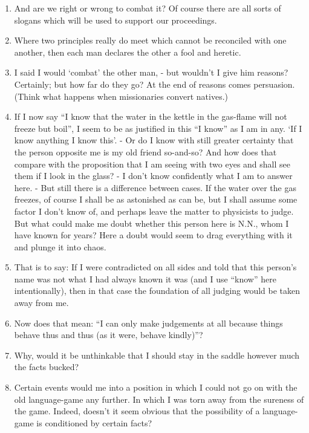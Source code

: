 \documentclass{book}
\begin{document}
\begin{enumerate}
\item
And are we right or wrong to combat it? Of course there are all sorts of
slogans which will be used to support our proceedings.

\item
Where two principles really do meet which cannot be reconciled with one
another, then each man declares the other a fool and heretic.

\item
I said I would `combat' the other man, - but wouldn't I give him reasons?
Certainly; but how far do they go? At the end of reasons comes persuasion.
(Think what happens when missionaries convert natives.)

\item
If I now say ``I know that the water in the kettle in the gas-flame will not
freeze but boil'', I seem to be as justified in this ``I know'' as I am in any.
`If I know anything I know this'. - Or do I know with still greater certainty
that the person opposite me is my old friend so-and-so? And how does that
compare with the proposition that I am seeing with two eyes and shall see them
if I look in the glass? - I don't know confidently what I am to answer here. -
But still there is a difference between cases. If the water over the gas
freezes, of course I shall be as astonished as can be, but I shall assume some
factor I don't know of, and perhaps leave the matter to physicists to judge.
But what could make me doubt whether this person here is N.N., whom I have
known for years? Here a doubt would seem to drag everything with it and plunge
it into chaos.

\item
That is to say: If I were contradicted on all sides and told that this person's
name was not what I had always known it was (and I use ``know'' here
intentionally), then in that case the foundation of all judging would be taken
away from me.

\item
Now does that mean: ``I can only make judgements at all because things behave
thus and thus (as it were, behave kindly)''?

\item
Why, would it be unthinkable that I should stay in the saddle however much the
facts bucked?

\item
Certain events would me into a position in which I could not go on with the old
language-game any further. In which I was torn away from the sureness of the
game.  Indeed, doesn't it seem obvious that the possibility of a language-game
is conditioned by certain facts?


\end{enumerate}
\end{document}
